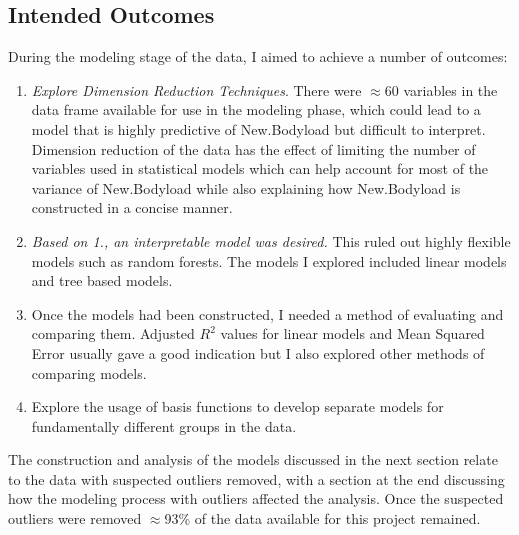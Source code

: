 \subsection{Intended Outcomes}
During the modeling stage of the data, I aimed to achieve a number of outcomes: 
\begin{enumerate}
	\item \emph{Explore Dimension Reduction Techniques}. There were $\approx$60 variables in the data frame available for use in the modeling phase, which could lead to a model that is highly predictive of New.Bodyload but difficult to interpret. Dimension reduction of the data has the effect of limiting the number of variables used in statistical models which can help account for most of the variance of New.Bodyload while also explaining how New.Bodyload is constructed in a concise manner.
	\item \emph{Based on 1., an interpretable model was desired.} This ruled out highly flexible models such as random forests. The models I explored included 
	linear models and tree based models.
	\item Once the models had been constructed, I needed a method of evaluating and comparing them. Adjusted $R^2$ values for linear models and Mean Squared Error usually gave a good indication but I also explored other methods of comparing models.
	\item Explore the usage of basis functions to develop separate models for fundamentally different groups in the data.
\end{enumerate}
The construction and analysis of the models discussed in the next section relate to the data with suspected outliers removed, with a section at the end discussing how the modeling process with outliers affected the analysis. Once the suspected outliers were removed $\approx$93\% of the data available for this project remained.

